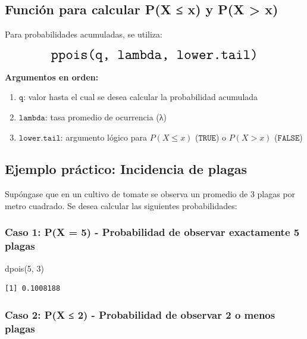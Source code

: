 \documentclass[
  spanish,
  letterpaper,
]{book}
\newenvironment{Shaded}{\begin{snugshade}}{\end{snugshade}}
\newcommand{\DecValTok}[1]{\textcolor[rgb]{0.68,0.00,0.00}{#1}}
\newcommand{\FunctionTok}[1]{\textcolor[rgb]{0.28,0.35,0.67}{#1}}
\newcommand{\NormalTok}[1]{\textcolor[rgb]{0.00,0.23,0.31}{#1}}
\begin{document}
\subsection{Función para calcular P(X ≤ x) y P(X \textgreater{}
x)}\label{funciuxf3n-para-calcular-px-x-y-px-x-1}

Para probabilidades acumuladas, se utiliza:

\[\LARGE \texttt{ppois(q, lambda, lower.tail)}  \]

\textbf{Argumentos en orden:}

\begin{enumerate}
\def\labelenumi{\arabic{enumi}.}
\item
  \(\texttt{q}\): valor hasta el cual se desea calcular la probabilidad
  acumulada
\item
  \(\texttt{lambda}\): tasa promedio de ocurrencia (λ)
\item
  \(\texttt{lower.tail}\): argumento lógico para \(P(X \leq x)\)
  (\(\texttt{TRUE}\)) o \(P(X > x)\) (\(\texttt{FALSE}\))
\end{enumerate}

\subsection{Ejemplo práctico: Incidencia de
plagas}\label{ejemplo-pruxe1ctico-incidencia-de-plagas}

Supóngase que en un cultivo de tomate se observa un promedio de 3 plagas
por metro cuadrado. Se desea calcular las siguientes probabilidades:

\subsubsection{Caso 1: P(X = 5) - Probabilidad de observar exactamente 5
plagas}\label{caso-1-px-5---probabilidad-de-observar-exactamente-5-plagas}

\begin{Shaded}
\begin{Highlighting}[]
\FunctionTok{dpois}\NormalTok{(}\DecValTok{5}\NormalTok{, }\DecValTok{3}\NormalTok{)}
\end{Highlighting}
\end{Shaded}

\begin{verbatim}
[1] 0.1008188
\end{verbatim}

\subsubsection{Caso 2: P(X ≤ 2) - Probabilidad de observar 2 o menos
plagas}\label{caso-2-px-2---probabilidad-de-observar-2-o-menos-plagas}
\end{document}

